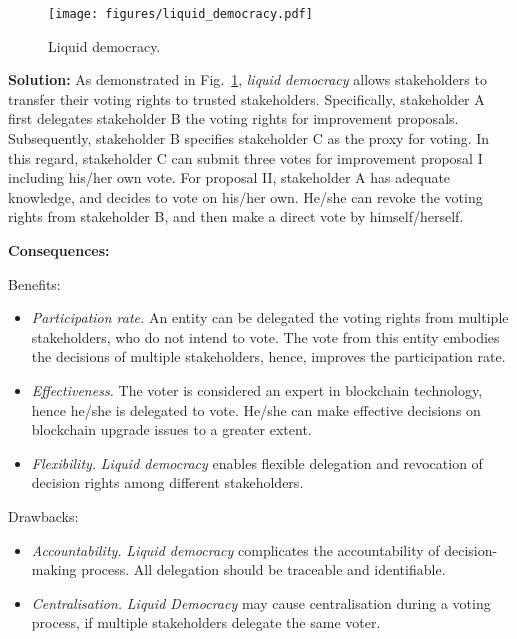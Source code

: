\documentclass{article}
\begin{document}
\begin{figure}[!ht]
	\centering
	\texttt{[image: figures/liquid\_democracy.pdf]}
	\caption{Liquid democracy.}
	\label{pic:liquid_democracy}
\end{figure}

\vspace{0.5em}\noindent \textbf{Solution:} As demonstrated in Fig.~\ref{pic:liquid_democracy}, \textit{liquid democracy} allows stakeholders to transfer their voting rights to trusted stakeholders. Specifically, stakeholder A first delegates stakeholder B the voting rights for improvement proposals. Subsequently, stakeholder B specifies stakeholder C as the proxy for voting. In this regard, stakeholder C can submit three votes for improvement proposal I including his/her own vote. For proposal II, stakeholder A has adequate knowledge, and decides to vote on his/her own. He/she can revoke the voting rights from stakeholder B, and then make a direct vote by himself/herself.

\vspace{0.5em}\noindent \textbf{Consequences:} 

Benefits:
\begin{itemize}
  \item \textit{Participation rate.} An entity can be delegated the voting rights from multiple stakeholders, who do not intend to vote. The vote from this entity embodies the decisions of multiple stakeholders, hence, improves the participation rate.

  \item \textit{Effectiveness.} The voter is considered an expert in blockchain technology, hence he/she is delegated to vote. He/she can make effective decisions on blockchain upgrade issues to a greater extent.
    
  \item \textit{Flexibility.} \textit{Liquid democracy} enables flexible delegation and revocation of decision rights among different stakeholders.
\end{itemize}

Drawbacks: 
\begin{itemize}

   \item \textit{Accountability.} \textit{Liquid democracy} complicates the accountability of decision-making process. All delegation should be traceable and identifiable.
   
   \item \textit{Centralisation.} \textit{Liquid Democracy} may cause centralisation during a voting process, if multiple stakeholders delegate the same voter.
\end{itemize}
\end{document}

